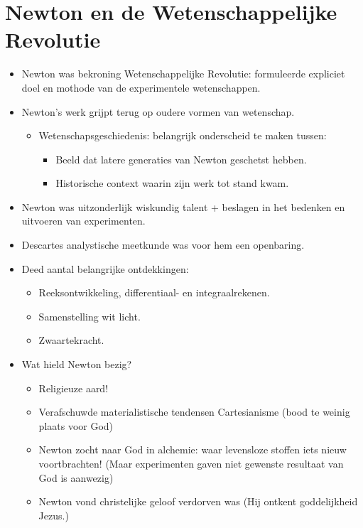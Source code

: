 \documentclass{article}
\begin{document}
  \section{Newton en de Wetenschappelijke Revolutie}
    \begin{itemize}
      \item Newton was bekroning Wetenschappelijke Revolutie: formuleerde expliciet doel en mothode van de experimentele wetenschappen.
      \item Newton's werk grijpt terug op oudere vormen van wetenschap.
      \begin{itemize}
        \item Wetenschapsgeschiedenis: belangrijk onderscheid te maken tussen:
        \begin{itemize}
          \item Beeld dat latere generaties van Newton geschetst hebben.
          \item Historische context waarin zijn werk tot stand kwam.
        \end{itemize}
      \end{itemize}
      \item Newton was uitzonderlijk wiskundig talent + beslagen in het bedenken en uitvoeren van experimenten.
      \item Descartes analystische meetkunde was voor hem een openbaring.
      \item Deed aantal belangrijke ontdekkingen:
      \begin{itemize}
        \item Reeksontwikkeling, differentiaal- en integraalrekenen.
        \item Samenstelling wit licht.
        \item Zwaartekracht.
      \end{itemize}
      \item Wat hield Newton bezig?
      \begin{itemize}
        \item Religieuze aard!
        \item Verafschuwde materialistische tendensen Cartesianisme (bood te weinig plaats voor God)
        \item Newton zocht naar God in alchemie: waar levensloze stoffen iets nieuw voortbrachten! (Maar experimenten gaven niet gewenste resultaat van God is aanwezig)
        \item Newton vond christelijke geloof verdorven was (Hij ontkent goddelijkheid Jezus.)
      \end{itemize}

\end{itemize}
\end{document}
